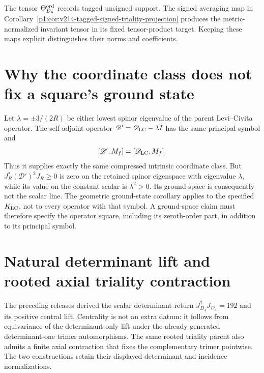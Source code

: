 \documentclass[11pt]{article}
\begin{document}
\begin{remark}
\label{p1:rem:v561-triality-physical-firewall}
The tensor \(\Theta_{D_4}^{\rm ord}\) records tagged unsigned support.
The signed averaging map in
Corollary~\ref{p1:cor:v214-tagged-signed-triality-projection} produces the
metric-normalized invariant tensor in its fixed tensor-product target.
Keeping these maps explicit distinguishes their norms and coefficients.
\end{remark}


\section{Why the coordinate class does not fix a square's ground state}
\label{p1:app:v233-square-owner}
Let \(\lambda=\pm3/(2R)\) be either lowest spinor eigenvalue of the
parent Levi--Civita operator. The self-adjoint operator
\(\mathscr D'=\mathscr D_{\rm LC}-\lambda I\) has the same principal
symbol and
\[
 [\mathscr D',M_f]=[\mathscr D_{\rm LC},M_f].
\]
Thus it supplies exactly the same compressed intrinsic coordinate
class. But \(J_R^*(\mathscr D')^2J_R\ge0\) is zero on the retained
spinor eigenspace with eigenvalue \(\lambda\), while its value on the
constant scalar is \(\lambda^2>0\). Its ground space is consequently
not the scalar line. The geometric ground-state corollary applies to
the specified \(K_{\rm LC}\), not to every operator with that symbol.
A ground-space claim must therefore specify the operator square, including
its zeroth-order part, in addition to its principal symbol.






\section{Natural determinant lift and rooted axial triality contraction}
\label{p1:sec:v562-d4-natural-lift-axial-triality}

The preceding releases derived the scalar determinant return
\(J_{D_4}^{\dagger}J_{D_4}=192\) and its positive central lift.  Centrality is
not an extra datum: it follows from equivariance of the determinant-only lift
under the already generated determinant-one trimer automorphisms.  The same
rooted triality parent also admits a finite axial contraction that fixes the
complementary trimer pointwise.  The two constructions retain their
displayed determinant and incidence normalizations.
\end{document}
